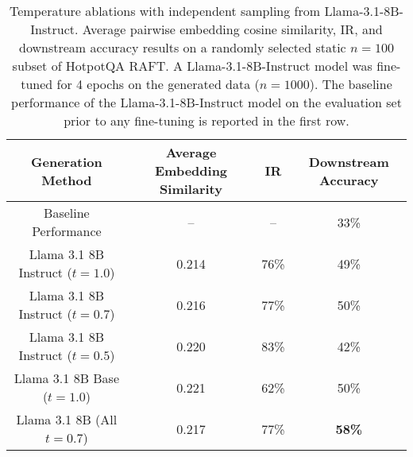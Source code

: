 \begin{table}[H]
\caption{Temperature ablations with independent sampling from Llama-3.1-8B-Instruct. Average pairwise embedding cosine similarity, IR, and downstream accuracy results on a randomly selected static $n=100$ subset of HotpotQA RAFT. A Llama-3.1-8B-Instruct model was fine-tuned for 4 epochs on the generated data ($n=1000$). The baseline performance of the Llama-3.1-8B-Instruct model on the evaluation set prior to any fine-tuning is reported in the first row.}
\label{hotpot-temp}
\vskip 0.1in
\begin{center}
\begin{small}
\begin{sc}
\begin{tabular}{c|ccc}
\toprule
Generation Method & Average Embedding Similarity & IR & Downstream Accuracy \\
\midrule
Baseline Performance              &   --  &  --  & 33\% \\
\midrule
Llama 3.1 8B Instruct ($t=1.0$)   & 0.214 & 76\% & 49\% \\
Llama 3.1 8B Instruct ($t=0.7$)   & 0.216 & 77\% & 50\% \\
Llama 3.1 8B Instruct ($t=0.5$)   & 0.220 & 83\% & 42\% \\
Llama 3.1 8B Base ($t=1.0$)       & 0.221 & 62\% & 50\% \\
\Sys{} Llama 3.1 8B (All $t=0.7$) & 0.217 & 77\% & \textbf{58\%} \\
\bottomrule
\end{tabular}
\end{sc}
\end{small}
\end{center}
\vskip -0.1in
\end{table}
